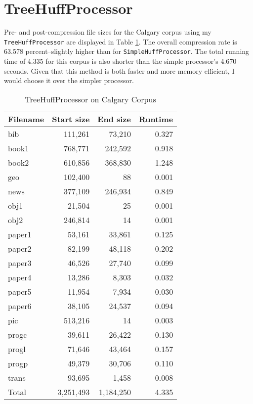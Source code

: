 \documentclass[12pt]{article}
\begin{document}
\section{TreeHuffProcessor}

Pre- and post-compression file sizes for the Calgary corpus using my \texttt{TreeHuffProcessor} are displayed in Table \ref{tree-calgary}. The overall compression rate is 63.578 percent--slightly higher than for \texttt{SimpleHuffProcessor}. The total running time of 4.335 for this corpus is also shorter than the simple processor's 4.670 seconds. Given that this method is both faster and more memory efficient, I would choose it over the simpler processor. 

\begin{table}[h!]
\centering
\caption{TreeHuffProcessor on Calgary Corpus}
\label{tree-calgary}
\begin{tabular}{lrrr}
\toprule
Filename & Start size & End size & Runtime \\
\midrule
bib & 111,261 & 73,210 & 0.327 \\
book1 & 768,771 & 242,592 & 0.918 \\
book2 & 610,856 & 368,830 & 1.248 \\
geo & 102,400 & 88 & 0.001 \\
news & 377,109 & 246,934 & 0.849 \\
obj1 & 21,504 & 25 & 0.001 \\
obj2 & 246,814 & 14 & 0.001 \\
paper1 & 53,161 & 33,861 & 0.125 \\
paper2 & 82,199 & 48,118 & 0.202 \\
paper3 & 46,526 & 27,740 & 0.099 \\
paper4 & 13,286 & 8,303 & 0.032 \\
paper5 & 11,954 & 7,934 & 0.030 \\
paper6 & 38,105 & 24,537 & 0.094 \\
pic & 513,216 & 14 & 0.003 \\
progc & 39,611 & 26,422 & 0.130 \\
progl & 71,646 & 43,464 & 0.157 \\
progp & 49,379 & 30,706 & 0.110 \\
trans & 93,695 & 1,458 & 0.008 \\
\midrule
Total & 3,251,493 & 1,184,250 & 4.335 \\
\bottomrule
\end{tabular}
\end{table}
\end{document}
